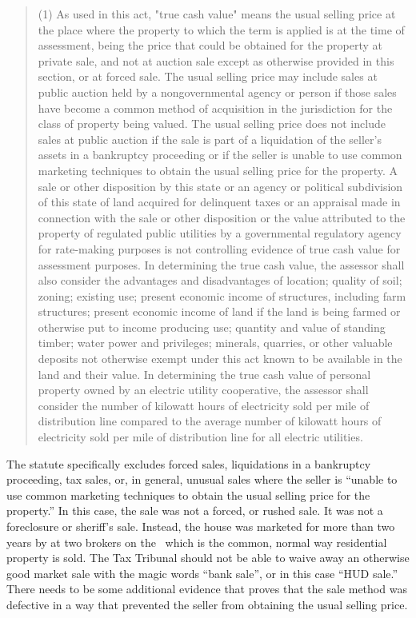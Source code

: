 \documentclass[12pt,\documentclassflag]{michiganCourtOfAppealsBrief}
\begin{document}
\begin{quote}
  (1) As used in this act, "true cash value" means the usual selling price at the place where the property to which the term is applied is at the time of assessment, being the price that could be obtained for the property at private sale, and not at auction sale except as otherwise provided in this section, or at forced sale. The usual selling price may include sales at public auction held by a nongovernmental agency or person if those sales have become a common method of acquisition in the jurisdiction for the class of property being valued. The usual selling price does not include sales at public auction if the sale is part of a liquidation of the seller's assets in a bankruptcy proceeding or if the seller is unable to use common marketing techniques to obtain the usual selling price for the property. A sale or other disposition by this state or an agency or political subdivision of this state of land acquired for delinquent taxes or an appraisal made in connection with the sale or other disposition or the value attributed to the property of regulated public utilities by a governmental regulatory agency for rate-making purposes is not controlling evidence of true cash value for assessment purposes. In determining the true cash value, the assessor shall also consider the advantages and disadvantages of location; quality of soil; zoning; existing use; present economic income of structures, including farm structures; present economic income of land if the land is being farmed or otherwise put to income producing use; quantity and value of standing timber; water power and privileges; minerals, quarries, or other valuable deposits not otherwise exempt under this act known to be available in the land and their value. In determining the true cash value of personal property owned by an electric utility cooperative, the assessor shall consider the number of kilowatt hours of electricity sold per mile of distribution line compared to the average number of kilowatt hours of electricity sold per mile of distribution line for all electric utilities.
\end{quote}

The statute specifically excludes forced sales, liquidations in a bankruptcy proceeding, tax sales, or, in general, unusual sales where the seller is ``unable to use common marketing techniques to obtain the usual selling price for the property.'' In this case, the sale was not a forced, or rushed sale. It was not a foreclosure or sheriff's sale. Instead, the house was marketed for more than two years by at two brokers on the \MLS\ which is the common, normal way residential property is sold. The Tax Tribunal should not be able to waive away an otherwise good market sale with the magic words ``bank sale'', or in this case ``HUD sale.'' There needs to be some additional evidence that proves that the sale method was defective in a way that prevented the seller from obtaining the usual selling price.
\end{document}
